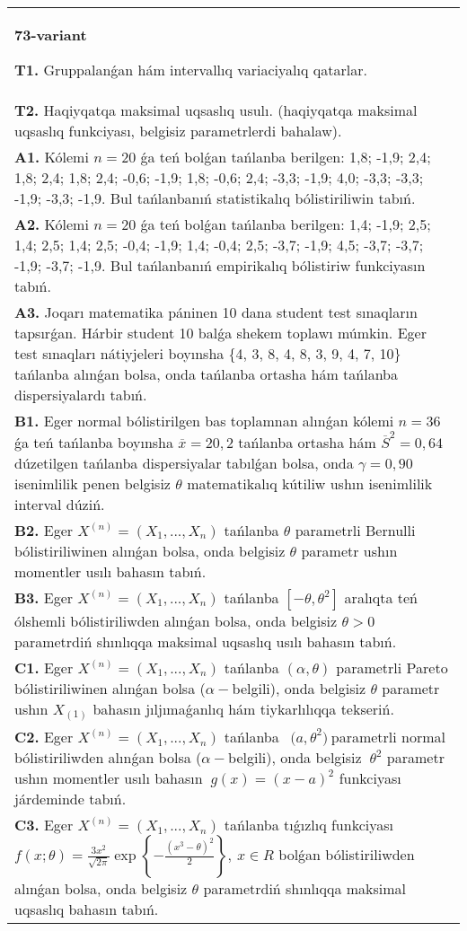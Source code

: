 \documentclass{article}
\begin{document}
\begin{tabular}{m{17cm}}
\textbf{73-variant}
\newline

\textbf{T1.} 
Gruppalanǵan hám intervallıq variaciyalıq qatarlar.
 \\
\textbf{T2.} 
Haqiyqatqa maksimal uqsaslıq usulı. (haqiyqatqa maksimal uqsaslıq funkciyası, belgisiz parametrlerdi bahalaw).
 \\
\textbf{A1.} 
Kólemi \(n = 20\) ǵa teń bolǵan tańlanba berilgen: 1,8; -1,9; 2,4; 1,8; 2,4; 1,8; 2,4; -0,6; -1,9; 1,8; -0,6; 2,4; -3,3; -1,9; 4,0; -3,3; -3,3; -1,9; -3,3; -1,9. Bul tańlanbanıń statistikalıq bólistiriliwin tabıń.
 \\
\textbf{A2.} 
Kólemi \(n = 20\) ǵa teń bolǵan tańlanba berilgen: 1,4; -1,9; 2,5; 1,4; 2,5; 1,4; 2,5; -0,4; -1,9; 1,4; -0,4; 2,5; -3,7; -1,9; 4,5; -3,7; -3,7; -1,9; -3,7; -1,9. Bul tańlanbanıń empirikalıq bólistiriw funkciyasın tabıń.
 \\
\textbf{A3.} 
Joqarı matematika páninen 10 dana student test sınaqların tapsırǵan. Hárbir student 10 balǵa shekem toplawı múmkin. Eger test sınaqları nátiyjeleri boyınsha \{4, 3, 8, 4, 8, 3, 9, 4, 7, 10\} tańlanba alınǵan bolsa, onda tańlanba ortasha hám tańlanba dispersiyalardı tabıń.
 \\
\textbf{B1.} 
Eger normal bólistirilgen bas toplamnan alınǵan kólemi \(n = 36\) ǵa teń tańlanba boyınsha \(\overline{x} = 20,2\) tańlanba ortasha hám \({\overline{S}}^{2} = 0,64\) dúzetilgen tańlanba dispersiyalar tabılǵan bolsa, onda \(\gamma = 0,90\) isenimlilik penen belgisiz \(\theta\) matematikalıq kútiliw ushın isenimlilik interval dúziń.
 \\
\textbf{B2.} 
Eger \(X^{(n)} = \left( X_{1},...,X_{n} \right)\) tańlanba \(\theta\) parametrli Bernulli bólistiriliwinen alınǵan bolsa, onda belgisiz \(\theta\) parametr ushın momentler usılı bahasın tabıń.
 \\
\textbf{B3.} 
Eger \(X^{(n)} = \left( X_{1},...,X_{n} \right)\) tańlanba \(\left\lbrack - \theta,\theta^{2} \right\rbrack\) aralıqta teń ólshemli bólistiriliwden alınǵan bolsa, onda belgisiz \(\theta > 0\) parametrdiń shınlıqqa maksimal uqsaslıq usılı bahasın tabıń.
 \\
\textbf{C1.} 
Eger \(X^{(n)} = \left( X_{1},...,X_{n} \right)\) tańlanba \((\alpha,\theta)\) parametrli Pareto bólistiriliwinen alınǵan bolsa (\(\alpha -\)belgili), onda belgisiz \(\theta\) parametr ushın \(X_{(1)}\) bahasın jıljımaǵanlıq hám tiykarlılıqqa tekseriń.
 \\
\textbf{C2.} 
Eger \(X^{(n)} = \left( X_{1},...,X_{n} \right)\) tańlanba \({\ \ (a,\theta}^{2})\ \)parametrli normal bólistiriliwden alınǵan bolsa (\(\alpha -\)belgili), onda belgisiz \({\ \theta}^{2}\) parametr ushın momentler usılı bahasın \({\ g(x) = (x - a)}^{2}\) funkciyası járdeminde tabıń.
 \\
\textbf{C3.} 
Eger \(X^{(n)} = \left( X_{1},...,X_{n} \right)\) tańlanba tıǵızlıq funkciyası
$f(x;\theta) = \frac{3x^{2}}{\sqrt{2\pi}}\exp\left\{ - \frac{\left( x^{3} - \theta \right)^{2}}{2} \right\},\ x \in R$
bolǵan bólistiriliwden alınǵan bolsa, onda belgisiz \(\theta\) parametrdiń shınlıqqa maksimal uqsaslıq bahasın tabıń.
 \\


\end{tabular}
\end{document}
